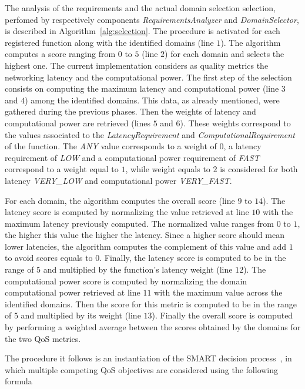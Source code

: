 The analysis of the requirements and the actual domain selection selection, perfomed by respectively components  \textit{RequirementsAnalyzer} and \textit{DomainSelector}, is described in Algorithm~\ref{alg:selection}. The procedure is activated for each registered function along with the identified domains (line $1$). The algorithm computes a score ranging from $0$ to $5$ (line $2$) for each domain and selects the highest one. The current implementation considers as quality metrics the networking latency and the computational power. The first step of the selection consists on computing the maximum latency and computational power (line $3$ and $4$) among the identified domains. This data, as already mentioned, were gathered during the previous phases. Then the weights of latency and computational power are retrieved (lines $5$ and $6$). These weights correspond to the values associated to the \textit{LatencyRequirement} and \textit{ComputationalRequirement} of the function. The \textit{ANY} value corresponds to a weight of $0$, a latency requirement of \textit{LOW} and a computational power requirement of \textit{FAST} correspond to a weight equal to $1$, while weight equals to $2$ is considered for both latency \textit{VERY\_LOW} and computational power \textit{VERY\_FAST}.

For each domain, the algorithm computes the overall score (line  $9$ to $14$). The latency score is computed by normalizing the value retrieved at line $10$ with the maximum latency previously computed. The normalized value ranges from $0$ to $1$, the higher this value the higher the latency. Since a higher score should mean lower latencies, the algorithm computes the complement of this value and add $1$ to avoid scores equals to $0$. Finally, the latency score is computed to be in the range of $5$ and multiplied by the function's latency weight (line $12$). The computational power score is computed by normalizing the domain computational power retrieved at line $11$ with the  maximum value across the identified domains. Then the score for this metric is computed to be in the range of $5$ and multiplied by its weight (line $13$). Finally the overall score is computed by performing a weighted average between the scores obtained by the domains for the two QoS metrics.

The procedure it follows is an instantiation of the SMART decision process~\cite{Olson1996}, in which multiple competing QoS objectives are considered using the following formula

